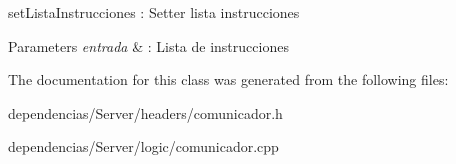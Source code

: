 set\+Lista\+Instrucciones \+: Setter lista instrucciones 


\begin{DoxyParams}{Parameters}
{\em entrada} & \+: Lista de instrucciones \\
\hline
\end{DoxyParams}


The documentation for this class was generated from the following files\+:\begin{DoxyCompactItemize}
\item 
dependencias/\+Server/headers/comunicador.\+h\item 
dependencias/\+Server/logic/comunicador.\+cpp\end{DoxyCompactItemize}
